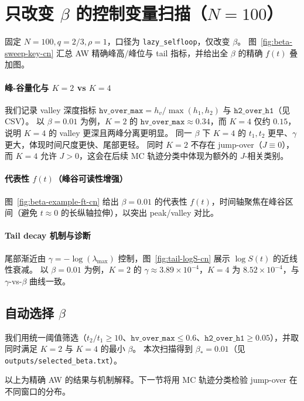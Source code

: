 \section{只改变 \texorpdfstring{$\beta$}{beta} 的控制变量扫描（\texorpdfstring{$N=100$}{N=100}）}
固定 $N=100,q=2/3,\rho=1$，口径为 \texttt{lazy\_selfloop}，仅改变 $\beta$。
图~\ref{fig:beta-sweep-key-cn} 汇总 AW 精确峰高/峰位与 tail 指标，并给出全 $\beta$ 的精确 $f(t)$ 叠加图。

\paragraph{峰-谷量化与 \texorpdfstring{$K=2$}{K=2} vs \texorpdfstring{$K=4$}{K=4}}
我们记录 valley 深度指标 $\texttt{hv\_over\_max}=h_v/\max(h_1,h_2)$ 与 $\texttt{h2\_over\_h1}$（见 CSV）。
以 $\beta=0.01$ 为例，$K=2$ 的 $\texttt{hv\_over\_max}\approx0.34$，而 $K=4$ 仅约 $0.15$，说明 $K=4$ 的 valley 更深且两峰分离更明显。
同一 $\beta$ 下 $K=4$ 的 $t_1,t_2$ 更早、$\gamma$ 更大，体现时间尺度更快、尾部更轻。
同时 $K=2$ 不存在 jump-over（$J\equiv0$），而 $K=4$ 允许 $J>0$，这会在后续 MC 轨迹分类中体现为额外的 $J$-相关类别。

\paragraph{代表性 \texorpdfstring{$f(t)$}{f(t)}（峰谷可读性增强）}
图~\ref{fig:beta-example-ft-cn} 给出 $\beta=0.01$ 的代表性 $f(t)$，时间轴聚焦在峰谷区间（避免 $t\approx0$ 的长纵轴拉伸），以突出 peak/valley 对比。

\paragraph{Tail decay 机制与诊断}
尾部渐近由 $\gamma=-\log(\lambda_{\max})$ 控制，图~\ref{fig:tail-logS-cn} 展示 $\log S(t)$ 的近线性衰减。
以 $\beta=0.01$ 为例，$K=2$ 的 $\gamma\approx3.89\times10^{-4}$，$K=4$ 为 $8.52\times10^{-4}$，与 $\gamma$-vs-$\beta$ 曲线一致。

\subsection{自动选择 \texorpdfstring{$\beta$}{beta}}
我们用统一阈值筛选（$t_2/t_1\ge10$、$\texttt{hv\_over\_max}\le0.6$、$\texttt{h2\_over\_h1}\ge0.05$），并取同时满足 $K=2$ 与 $K=4$ 的最小 $\beta$。
本次扫描得到 $\beta_\ast=0.01$（见 \texttt{outputs/selected\_beta.txt}）。

以上为精确 AW 的结果与机制解释。下一节将用 MC 轨迹分类检验 jump-over 在不同窗口的分布。
